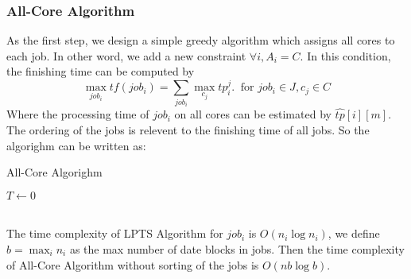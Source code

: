 \documentclass{llncs}
\begin{document}
\subsubsection{All-Core Algorithm}
  As the first step, we design a simple greedy algorithm which assigns all cores to each job. In other word, we add a new constraint $ \forall i, A_i = C$.  In this condition, the finishing time can be computed by
  $$\max_{job_i} tf(job_i) = \sum_{job_i} \max_{c_j}{tp_i^j}.  \ \text{ for } job_i \in J, c_j \in C $$
  Where the processing time of $job_i$ on all cores can be estimated by $\hat{tp}[i][m]$. The ordering of the jobs is relevent to the finishing time of all jobs. So the algorighm can be written as:\\
            \begin{minipage}[t]{0.9\textwidth}
            \begin{algorithm}[H]
              \BlankLine
              \caption{All-Core Algorighm}\label{Alg_1}
              \BlankLine
              $T \leftarrow 0$\;
             \end{algorithm}
             \end{minipage}\\

The time complexity of LPTS Algorithm for $job_i$ is $O(n_i\log n_i)$, we define $b = \max_i{n_i}$ as the max number of date blocks in jobs. Then the time complexity of All-Core Algorithm without sorting of the jobs is $O(nb\log b)$.
\end{document}
